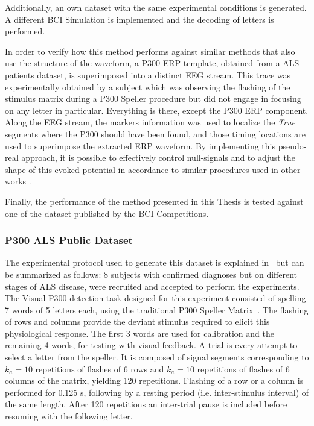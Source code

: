 Additionally, an own dataset with the same experimental conditions is generated.  A different BCI Simulation is implemented and the decoding of letters is performed. 


In order to verify how this method performs against similar methods that also use the structure of the waveform, a P300 ERP template, obtained from a ALS patients dataset, is superimposed into a distinct EEG stream.  This trace was experimentally obtained by a subject which was observing the flashing of the stimulus matrix during a P300 Speller procedure but did not engage in focusing on any letter in particular. Everything is there, except the P300 ERP component. Along the EEG stream, the markers information was used to localize the \textit{True} segments where the P300 should have been found, and those timing locations are used to superimpose the extracted ERP waveform.  By implementing this pseudo-real approach, it is possible to effectively control null-signals and to adjust the shape of this evoked potential in accordance to similar procedures used in other works \cite{Ouyang2017,Jaskowski2000,QuianQuiroga2003}.

Finally, the performance of the method presented in this Thesis is tested against one of the dataset published by the BCI Competitions. 

\subsubsection{P300 ALS Public Dataset} \label{ALSDataset}

The experimental protocol used to generate this dataset is explained in~\cite{Riccio2013} but can be summarized as follows:  8 subjects with confirmed diagnoses but on different stages of ALS disease, were recruited and accepted to perform the experiments. The Visual P300 detection task designed for this experiment consisted of spelling 7 words of 5 letters each, using the traditional P300 Speller Matrix~\cite{Farwell1988}. The flashing of rows and columns provide the deviant stimulus required to elicit this physiological response.  The first 3 words are used for calibration and the remaining 4 words, for testing with visual feedback.  A trial is every attempt to select a letter from the speller. It is composed of signal segments corresponding to $k_a =10$ repetitions of flashes of 6 rows and $k_a =10$ repetitions of flashes of 6 columns of the matrix, yielding 120 repetitions.  Flashing of a row or a column is performed for 0.125 s, following by a resting period (i.e. inter-stimulus interval) of the same length.  After 120 repetitions an inter-trial pause is included before resuming with the following letter.

